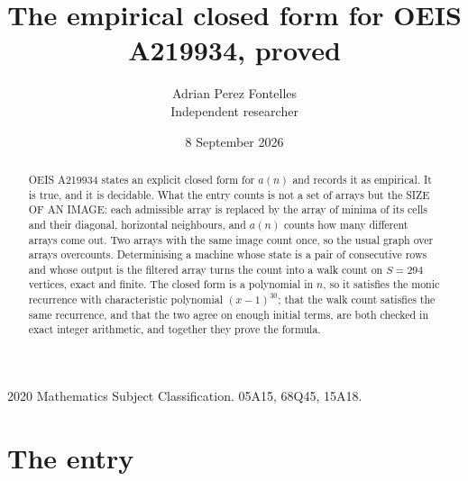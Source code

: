 \documentclass[11pt,a4paper]{article}
\title{The empirical closed form for OEIS A219934, proved}
\author{Adrian Perez Fontelles\\ \small Independent researcher}
\date{8 September 2026}
\theoremstyle{plain}
\theoremstyle{definition}
\begin{document}
\maketitle

\begin{abstract}
OEIS A219934 states an explicit closed form for $a(n)$ and records it as empirical. It is true, and
it is decidable. What the entry counts is not a set of arrays but the SIZE OF AN IMAGE: each
admissible array is replaced by the array of minima of its cells and their diagonal, horizontal neighbours,
and $a(n)$ counts how many different arrays come out. Two arrays with the same image count
once, so the usual graph over arrays overcounts. Determinising a machine whose state is a pair
of consecutive rows and whose output is the filtered array turns the count into a walk count on
$S=294$ vertices, exact and finite. The closed form is a polynomial in $n$, so it satisfies the
monic recurrence with characteristic polynomial $(x-1)^{30}$; that the walk count
satisfies the same recurrence, and that the two agree on enough initial terms, are both checked
in exact integer arithmetic, and together they prove the formula.
\end{abstract}

\noindent\small 2020 Mathematics Subject Classification. 05A15, 68Q45, 15A18.\normalsize

\section{The entry}
\end{document}
